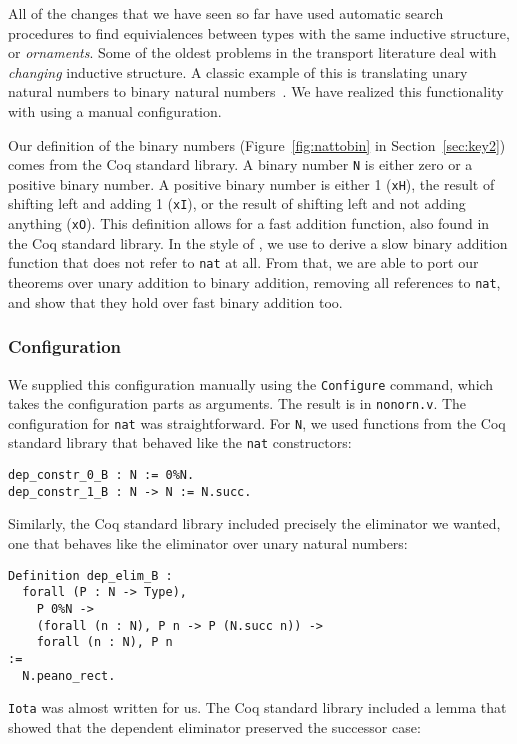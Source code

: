 All of the changes that we have seen so far have used automatic search procedures
to find equivialences between types with the same inductive structure, or \textit{ornaments}.
Some of the oldest problems in the transport literature deal with \textit{changing} inductive
structure.
A classic example of this is translating unary natural numbers to binary natural numbers~\cite{magaud2000changing}.
We have realized this functionality with \toolname using a manual configuration. %

Our definition of the binary numbers (Figure~\ref{fig:nattobin} in Section~\ref{sec:key2}) comes from the Coq standard library.
A binary number \lstinline{N} is either zero or a positive binary number. A positive binary number
is either 1 (\lstinline{xH}), the result of shifting left and adding 1 (\lstinline{xI}),
or the result of shifting left and not adding anything (\lstinline{xO}).
This definition allows for a fast addition function, also found in the Coq standard library.
In the style of \citet{magaud2000changing}, we use \toolname to derive a slow binary
addition function that does not refer to \lstinline{nat} at all.
From that, we are able to port our theorems over unary addition to binary addition,
removing all references to \lstinline{nat}, and show that they hold over fast binary addition too.

\subsubsection{Configuration}
We supplied this configuration manually using the \lstinline{Configure} command,
which takes the configuration parts as arguments.
The result is in \lstinline{nonorn.v}.
The configuration for \lstinline{nat} was straightforward.
For \lstinline{N}, we used functions from the Coq standard library that
behaved like the \lstinline{nat} constructors:

\begin{lstlisting}
dep_constr_0_B : N := 0%N.
dep_constr_1_B : N -> N := N.succ.
\end{lstlisting}
Similarly, the Coq standard library included precisely the eliminator we wanted, one that behaves
like the eliminator over unary natural numbers:

\begin{lstlisting}
Definition dep_elim_B :
  forall (P : N -> Type),
    P 0%N ->
    (forall (n : N), P n -> P (N.succ n)) ->
    forall (n : N), P n
:=
  N.peano_rect.
\end{lstlisting}
\lstinline{Iota} was almost written for us.
The Coq standard library included a lemma that showed that the dependent eliminator preserved the successor case:

